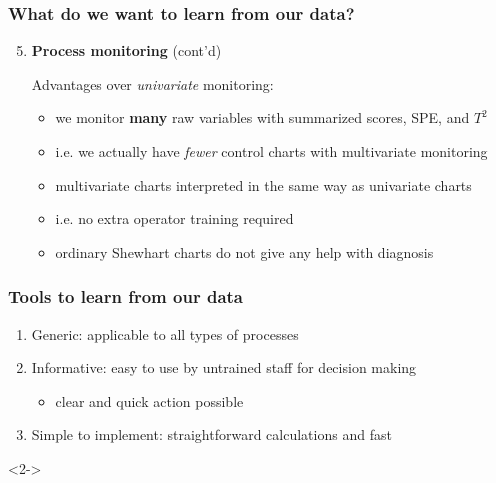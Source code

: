 \begin{frame}\frametitle{What do we want to learn from our data?}

\begin{enumerate}
	\setcounter{enumi}{4}
	\item 	{\bf \color{myGreen}Process monitoring} (cont'd)	

	\vspace{10pt}	
			Advantages over \emph{univariate} monitoring:
		
			\begin{itemize}
				\item 	we monitor \textbf{many} raw variables with summarized scores, SPE, and \( T^2 \)
				\item 	i.e. we actually have \emph{fewer} control charts with multivariate monitoring
				\item 	multivariate charts interpreted in the same way as univariate charts
				\item 	i.e. no extra operator training required
				\item 	ordinary Shewhart charts do not give any help with diagnosis
			\end{itemize}	
\end{enumerate}
\end{frame}

\begin{frame}\frametitle{Tools to learn from our data}

\begin{enumerate}
	\item 	\alert{Generic}: applicable to all types of processes
	\item 	\alert{Informative}: easy to use by untrained staff for decision making
		\begin{itemize}
			\item clear and quick action possible
		\end{itemize}
	\item 	\alert{Simple to implement}: straightforward calculations and fast
\end{enumerate}

\vspace{1cm}

\begin{exampleblock}{}<2->
\end{exampleblock}
\end{frame}